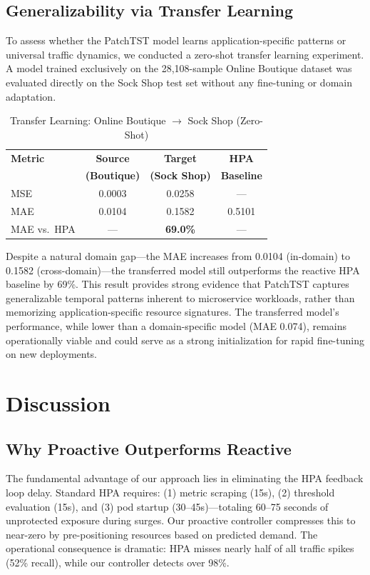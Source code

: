\documentclass[conference]{IEEEtran}
\begin{document}
\subsection{Generalizability via Transfer Learning}
To assess whether the PatchTST model learns application-specific patterns or universal traffic dynamics, we conducted a zero-shot transfer learning experiment. A model trained exclusively on the 28,108-sample Online Boutique dataset was evaluated directly on the Sock Shop test set without any fine-tuning or domain adaptation.

\begin{table}[htbp]
\caption{Transfer Learning: Online Boutique $\rightarrow$ Sock Shop (Zero-Shot)}
\label{tab:transfer}
\centering
\begin{tabular}{lccc}
\toprule
\textbf{Metric} & \textbf{Source} & \textbf{Target} & \textbf{HPA} \\
& \textbf{(Boutique)} & \textbf{(Sock Shop)} & \textbf{Baseline} \\
\midrule
MSE & 0.0003 & 0.0258 & --- \\
MAE & 0.0104 & 0.1582 & 0.5101 \\
\midrule
MAE vs.\ HPA & --- & \textbf{69.0\%} & --- \\
\bottomrule
\end{tabular}
\end{table}

Despite a natural domain gap---the MAE increases from 0.0104 (in-domain) to 0.1582 (cross-domain)---the transferred model still outperforms the reactive HPA baseline by 69\%. This result provides strong evidence that PatchTST captures generalizable temporal patterns inherent to microservice workloads, rather than memorizing application-specific resource signatures. The transferred model's performance, while lower than a domain-specific model (MAE 0.074), remains operationally viable and could serve as a strong initialization for rapid fine-tuning on new deployments.

\section{Discussion}\label{sec:discussion}

\subsection{Why Proactive Outperforms Reactive}
The fundamental advantage of our approach lies in eliminating the HPA feedback loop delay. Standard HPA requires: (1) metric scraping (15s), (2) threshold evaluation (15s), and (3) pod startup (30--45s)---totaling 60--75 seconds of unprotected exposure during surges. Our proactive controller compresses this to near-zero by pre-positioning resources based on predicted demand. The operational consequence is dramatic: HPA misses nearly half of all traffic spikes (52\% recall), while our controller detects over 98\%.
\end{document}
